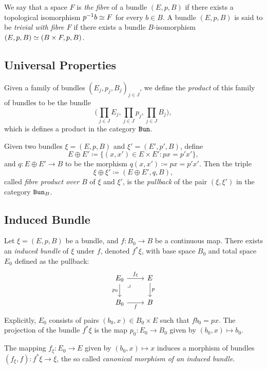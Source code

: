 \documentclass[../../../deep-dive]{subfile}
\begin{document}
\begin{definition}
\label{def:fibre-of-a-bundle}
We say that a space \(F\) is \emph{the fibre} of a bundle \((E, p, B)\) if there
exists a topological isomorphism \(p^{-1} b \simeq F\) for every \(b \in B\). A
bundle \((E, p, B)\) is said to be \emph{trivial with fibre \(F\)} if there
exists a bundle \(B\)-isomorphism \((E, p, B) \simeq (B \times F, p, B)\).
\end{definition}

\subsection{Universal Properties}

\begin{proposition}
\label{prop:bundle-products}
Given a family of bundles \((E_j, p_j, B_j)_{j \in J}\), we define the
\emph{product} of this family of bundles to be the bundle
\[
\Big( \prod_{j \in J} E_j, \prod_{j \in J} p_j, \prod_{j \in J} B_j \Big),
\]
which is defines a product in the category \({\texttt{Bun}}\).
\end{proposition}

\begin{proposition}
\label{prop:fibre-product-over-B}
Given two bundles \(\xi = (E, p, B)\) and \(\xi' = (E', p', B)\), define
\[
E \oplus E' \coloneq \{(x, x') \in E \times E' \colon p x = p' x'\},
\]
and \(q: E \oplus E' \to B\) to be the morphism
\(q(x, x') \coloneq p x = p' x'\). Then the triple
\[
\xi \oplus \xi' \coloneq (E \oplus E', q, B),
\]
called \emph{fibre product over \(B\)} of \(\xi\) and \(\xi'\), is the
\emph{pullback} of the pair \((\xi, \xi')\) in the category \({\texttt{Bun}}_B\).
\end{proposition}

\subsection{Induced Bundle}

\begin{definition}
\label{def:induced-bundle}
Let \(\xi = (E, p, B)\) be a bundle, and \(f: B_0 \to B\) be a continuous
map. There exists an \emph{induced bundle} of \(\xi\) under \(f\), denoted
\(f^{*} \xi\), with base space \(B_0\) and total space \(E_0\) defined as the
pullback:
\[
\begin{tikzcd}
E_0
\ar[rd, phantom, very near start, "\lrcorner"]
\ar[r, "f_{\xi}"]
\ar[d, "p_0"']
&E
\ar[d, "p"]
\\
B_0 \ar[r, "f"']
&B
\end{tikzcd}
\]
Explicitly, \(E_0\) consists of pairs \((b_0, x) \in B_0 \times E\) such that
\(f b_0 = p x\). The projection of the bundle \(f^{*} \xi\) is the map
\(p_0: E_0 \to B_0\) given by \((b_0, x) \mapsto b_0\).

The mapping \(f_{\xi}: E_0 \to E\) given by \((b_0, x) \mapsto x\) induces a
morphism of bundles \((f_{\xi}, f): f^{*} \xi \to \xi\), the so called
\emph{canonical morphism of an induced bundle}.
\end{definition}
\end{document}
